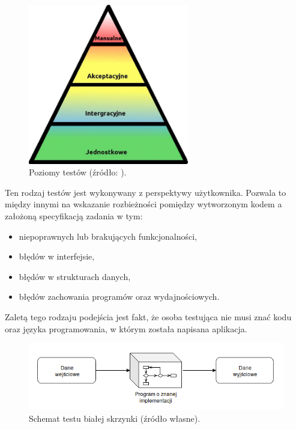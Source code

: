\begin{figure}[h]
    \centering
    \includegraphics[width = 7cm]{chapter02/tests_levels.jpg}
    \caption{Poziomy testów (źródło: \cite{tests-levels}).}
    \label{fig:tests-levels}
\end{figure}

Ten rodzaj testów jest wykonywany z perspektywy użytkownika.
Pozwala to między innymi na wskazanie rozbieżności pomiędzy wytworzonym kodem a założoną specyfikacją zadania w tym:
\begin {itemize}
\item niepoprawnych lub brakujących funkcjonalności,
\item błędów w interfejsie,
\item błędów w strukturach danych,
\item błędów zachowania programów oraz wydajnościowych.
\end{itemize}
Zaletą tego rodzaju podejścia jest fakt, że osoba testująca nie musi znać kodu oraz języka programowania, w którym została napisana aplikacja.

\begin{figure}[h]
    \centering
    \includegraphics[width = 13cm]{chapter02/white-box.png}
    \caption{Schemat testu białej skrzynki (źródło własne).}
    \label{fig:white-box}
\end{figure}


